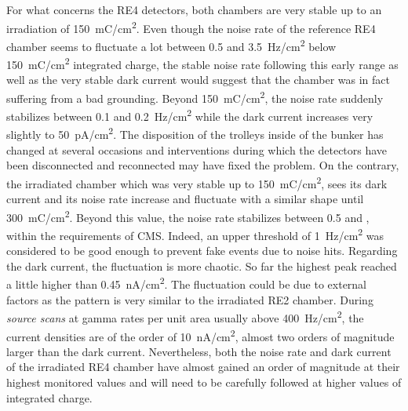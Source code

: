 	For what concerns the RE4 detectors, both chambers are very stable up to an irradiation of \SI{150}{mC/cm^2}. Even though the noise rate of the reference RE4 chamber seems to fluctuate a lot between 0.5 and \SI{3.5}{Hz/cm^2} below \SI{150}{mC/cm^2} integrated charge, the stable noise rate following this early range as well as the very stable dark current would suggest that the chamber was in fact suffering from a bad grounding. Beyond \SI{150}{mC/cm^2}, the noise rate suddenly stabilizes between 0.1 and \SI{0.2}{Hz/cm^2} while the dark current increases very slightly to \SI{50}{pA/cm^2}. The disposition of the trolleys inside of the bunker has changed at several occasions and interventions during which the detectors have been disconnected and reconnected may have fixed the problem. On the contrary, the irradiated chamber which was very stable up to \SI{150}{mC/cm^2}, sees its dark current and its noise rate increase and fluctuate with a similar shape until \SI{300}{mC/cm^2}. Beyond this value, the noise rate stabilizes between 0.5 and , within the requirements of CMS. Indeed, an upper threshold of \SI{1}{Hz/cm^2} was considered to be good enough to prevent fake events due to noise hits. Regarding the dark current, the fluctuation is more chaotic. So far the highest peak reached a little higher than \SI{0.45}{nA/cm^2}. The fluctuation could be due to external factors as the pattern is very similar to the irradiated RE2 chamber. During \textit{source scans} at gamma rates per unit area usually above \SI{400}{Hz/cm^2}, the current densities are of the order of \SI{10}{nA/cm^2}, almost two orders of magnitude larger than the dark current. Nevertheless, both the noise rate and dark current of the irradiated RE4 chamber have almost gained an order of magnitude at their highest monitored values and will need to be carefully followed at higher values of integrated charge.
	
